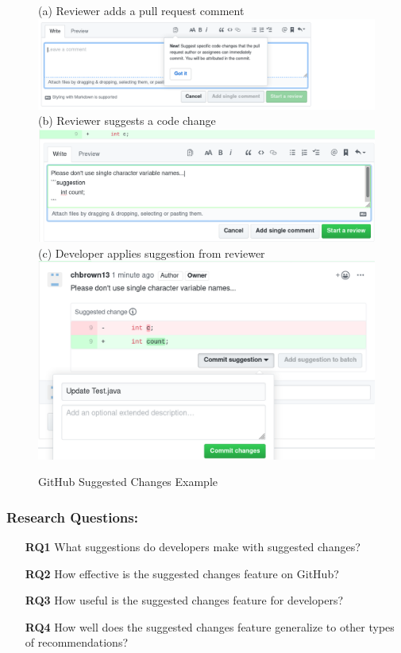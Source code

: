 \begin{figure}[]
\centering
    (a) Reviewer adds a pull request comment \\
    \includegraphics[width=\textwidth]{images/sugg1.png}
    (b) Reviewer suggests a code change \\
    \includegraphics[width=\textwidth]{images/sugg2.png}
   (c) Developer applies suggestion from reviewer \\
    \includegraphics[width=\textwidth]{images/sugg3.png}
    \caption{GitHub Suggested Changes Example}    
    \label{fig:sugg} 
\end{figure}

\subsubsection{Research Questions:}

\begin{itemize}
    \item[\textbf{RQ1}] What suggestions do developers make with suggested changes?
    \item[\textbf{RQ2}] How effective is the suggested changes feature on GitHub?
    \item[\textbf{RQ3}] How useful is the suggested changes feature for developers?
    \item[\textbf{RQ4}] How well does the suggested changes feature generalize to other types of recommendations?
\end{itemize}

